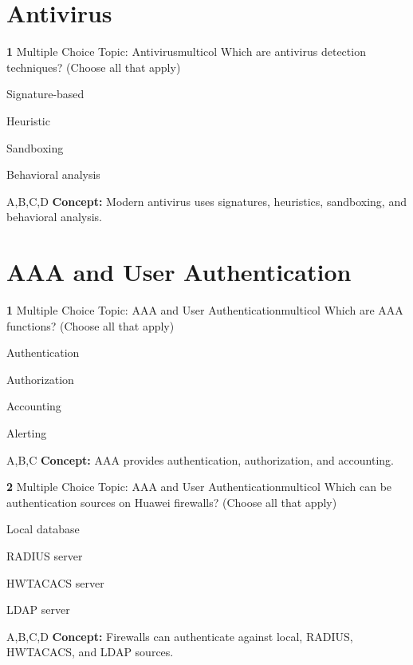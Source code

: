 \documentclass[10pt,a4paper]{article}
\begin{document}
\section{Antivirus}
\begin{qcard}{\color{white}\textbf{1} \hfill \small Multiple Choice \textbar{} Topic: Antivirus}{multicol}
Which are antivirus detection techniques? (Choose all that apply)

\begin{qoptions}
\item Signature-based
\item Heuristic
\item Sandboxing
\item Behavioral analysis
\end{qoptions}
\begin{explainbox}{A,B,C,D}
\textbf{Concept:} Modern antivirus uses signatures, heuristics, sandboxing, and behavioral analysis.
\end{explainbox}
\end{qcard}

\section{AAA and User Authentication}
\begin{qcard}{\color{white}\textbf{1} \hfill \small Multiple Choice \textbar{} Topic: AAA and User Authentication}{multicol}
Which are AAA functions? (Choose all that apply)

\begin{qoptions}
\item Authentication
\item Authorization
\item Accounting
\item Alerting
\end{qoptions}
\begin{explainbox}{A,B,C}
\textbf{Concept:} AAA provides authentication, authorization, and accounting.
\end{explainbox}
\end{qcard}

\begin{qcard}{\color{white}\textbf{2} \hfill \small Multiple Choice \textbar{} Topic: AAA and User Authentication}{multicol}
Which can be authentication sources on Huawei firewalls? (Choose all that apply)

\begin{qoptions}
\item Local database
\item RADIUS server
\item HWTACACS server
\item LDAP server
\end{qoptions}
\begin{explainbox}{A,B,C,D}
\textbf{Concept:} Firewalls can authenticate against local, RADIUS, HWTACACS, and LDAP sources.
\end{explainbox}
\end{qcard}
\end{document}
